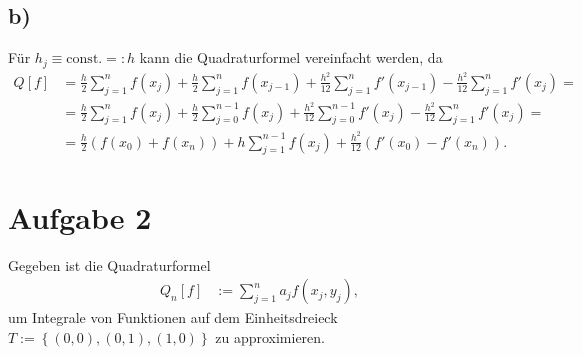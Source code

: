 \documentclass[english, parskip=full]{scrartcl}
\newcommand{\kla}{}
\newcommand{\klammer}{}
\newcommand{\tecxt}{}
\begin{document}
\subsection*{b)}
Für $h_j\equiv\tecxt\text{const.}=:h$ kann die Quadraturformel vereinfacht werden, da
\begin{align}
Q[f] &= \frac{h}{2}\sum_{j=1}^n f(x_j) + \frac{h}{2}\sum_{j=1}^n f(x_{j-1}) + \frac{h^2}{12}\sum_{j=1}^nf'(x_{j-1}) - \frac{h^2}{12}\sum_{j=1}^n f'(x_{j})=\\
&= \frac{h}{2}\sum_{j=1}^n f(x_j) + \frac{h}{2}\sum_{j=0}^{n-1} f(x_{j}) + \frac{h^2}{12}\sum_{j=0}^{n-1} f'(x_{j}) - \frac{h^2}{12}\sum_{j=1}^nf'(x_j)=\\
&= \frac{h}{2}\kla\left( f(x_0) + f(x_n) \right)+h\sum_{j=1}^{n-1} f(x_j) + \frac{h^2}{12}\kla\left( f'(x_0) - f'(x_n) \right).
\end{align}

\newpage 
\section*{Aufgabe 2}
Gegeben ist die Quadraturformel
\begin{align}
Q_n[f] &:= \sum_{j=1}^n a_jf(x_j,y_j),
\end{align}
um Integrale von Funktionen auf dem Einheitsdreieck $T:=\klammer\left\{ (0,0),(0,1),(1,0) \right\}$ zu approximieren.
\end{document}
